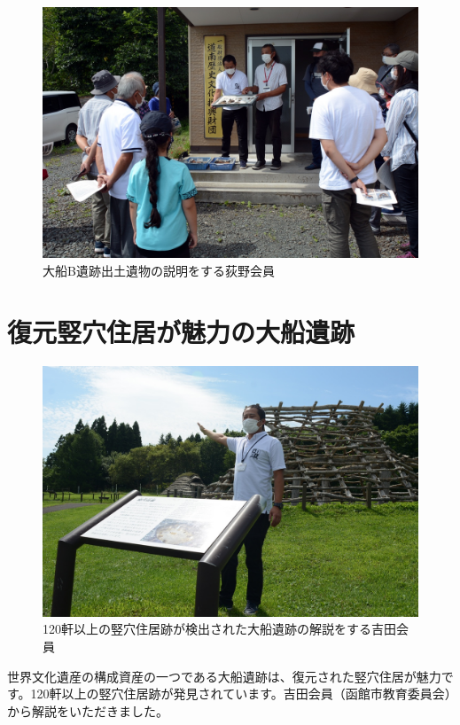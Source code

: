 \documentclass[a4j,11pt,twocolumn,openany]{jsbook}
\begin{document}
\begin{figure}[ht]
	\centering
	\includegraphics[width=\linewidth]{fig/01_Iseki_kengaku/01_Opening.JPG}
	\caption{大船B遺跡出土遺物の説明をする荻野会員}
	\label{}
\end{figure}

\section{復元竪穴住居が魅力の大船遺跡}

\begin{figure}[ht]
	\centering
	\includegraphics[width=\linewidth]{fig/01_Iseki_kengaku/02_Ofune.JPG}
	\caption{
		120軒以上の竪穴住居跡が検出された大船遺跡の解説をする吉田会員}
	\label{}
\end{figure}

世界文化遺産の構成資産の一つである大船遺跡は、復元された竪穴住居が魅力です。120軒以上の竪穴住居跡が発見されています。吉田会員（函館市教育委員会）から解説をいただきました。
\end{document}
